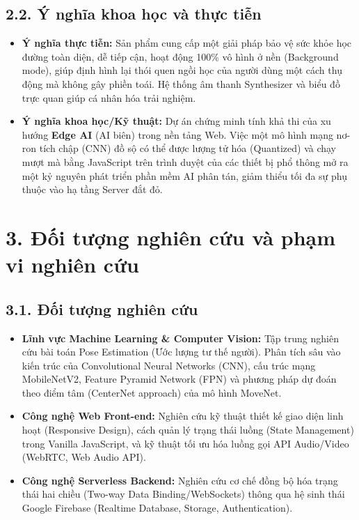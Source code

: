 \documentclass[12pt,a4paper]{report}
\begin{document}
\subsection*{2.2. Ý nghĩa khoa học và thực tiễn}
\begin{itemize}[leftmargin=*]
    \item \textbf{Ý nghĩa thực tiễn:} Sản phẩm cung cấp một giải pháp bảo vệ sức khỏe học đường toàn diện, dễ tiếp cận, hoạt động 100\% vô hình ở nền (Background mode), giúp định hình lại thói quen ngồi học của người dùng một cách thụ động mà không gây phiền toái. Hệ thống âm thanh Synthesizer và biểu đồ trực quan giúp cá nhân hóa trải nghiệm.
    \item \textbf{Ý nghĩa khoa học/Kỹ thuật:} Dự án chứng minh tính khả thi của xu hướng \textbf{Edge AI} (AI biên) trong nền tảng Web. Việc một mô hình mạng nơ-ron tích chập (CNN) đồ sộ có thể được lượng tử hóa (Quantized) và chạy mượt mà bằng JavaScript trên trình duyệt của các thiết bị phổ thông mở ra một kỷ nguyên phát triển phần mềm AI phân tán, giảm thiểu tối đa sự phụ thuộc vào hạ tầng Server đắt đỏ.
\end{itemize}

\section*{3. Đối tượng nghiên cứu và phạm vi nghiên cứu}
\subsection*{3.1. Đối tượng nghiên cứu}
\begin{itemize}
    \item \textbf{Lĩnh vực Machine Learning \& Computer Vision:} Tập trung nghiên cứu bài toán Pose Estimation (Ước lượng tư thế người). Phân tích sâu vào kiến trúc của Convolutional Neural Networks (CNN), cấu trúc mạng MobileNetV2, Feature Pyramid Network (FPN) và phương pháp dự đoán theo điểm tâm (CenterNet approach) của mô hình MoveNet.
    \item \textbf{Công nghệ Web Front-end:} Nghiên cứu kỹ thuật thiết kế giao diện linh hoạt (Responsive Design), cách quản lý trạng thái luồng (State Management) trong Vanilla JavaScript, và kỹ thuật tối ưu hóa luồng gọi API Audio/Video (WebRTC, Web Audio API).
    \item \textbf{Công nghệ Serverless Backend:} Nghiên cứu cơ chế đồng bộ hóa trạng thái hai chiều (Two-way Data Binding/WebSockets) thông qua hệ sinh thái Google Firebase (Realtime Database, Storage, Authentication).
\end{itemize}
\end{document}
